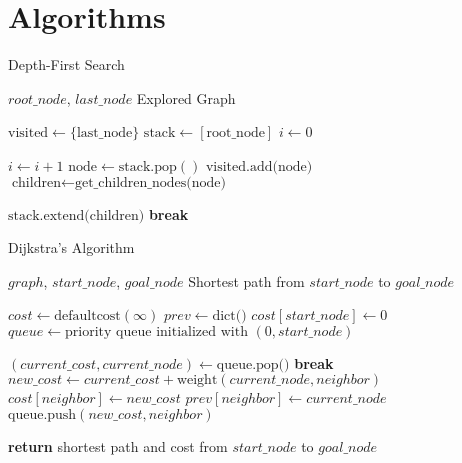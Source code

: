 \clearpage
\section{Algorithms}

\begin{algorithm}[H]
\caption{Depth-First Search}
\label{alg:dfs}
\begin{algorithmic}[1]
\REQUIRE $root\_node$, $last\_node$
\ENSURE Explored Graph

\STATE $\text{visited} \gets \{\text{last\_node}\}$ 
\STATE $\text{stack} \gets [\text{root\_node}]$ 
\STATE $i \gets 0$ 

    \STATE $i \gets i + 1$
    \STATE $\text{node} \gets \text{stack.pop}()$
        \STATE $\text{visited.add(node)}$
        \STATE $\text{children} \gets \text{get\_children\_nodes(node)}$
        
            \STATE $\text{stack.extend(children)}$ 
        \ENDIF
    \ENDIF
        \STATE \textbf{break} 
    \ENDIF
\ENDWHILE
\end{algorithmic}
\end{algorithm}


\begin{algorithm}[H]
  \caption{Dijkstra's Algorithm}
  \label{alg:dijkstra}
  \begin{algorithmic}[1]
  \REQUIRE $graph$, $start\_node$, $goal\_node$
  \ENSURE Shortest path from $start\_node$ to $goal\_node$
  
  \STATE $cost \gets \text{defaultcost}(\infty)$ 
  \STATE $prev \gets \text{dict()}$ 
  \STATE $cost[start\_node] \gets 0$
  \STATE $queue \gets \text{priority queue initialized with } (0, start\_node)$
  
      \STATE $(current\_cost, current\_node) \gets \text{queue.pop()}$
          \STATE \textbf{break}
      \ENDIF
          \STATE $new\_cost \gets current\_cost + \text{weight}(current\_node, neighbor)$
              \STATE $cost[neighbor] \gets new\_cost$
              \STATE $prev[neighbor] \gets current\_node$
              \STATE $\text{queue.push}(new\_cost, neighbor)$
          \ENDIF
      \ENDFOR
  \ENDWHILE
  
  \STATE \textbf{return} shortest path and cost from $start\_node$ to $goal\_node$
  \end{algorithmic}
\end{algorithm}
  

